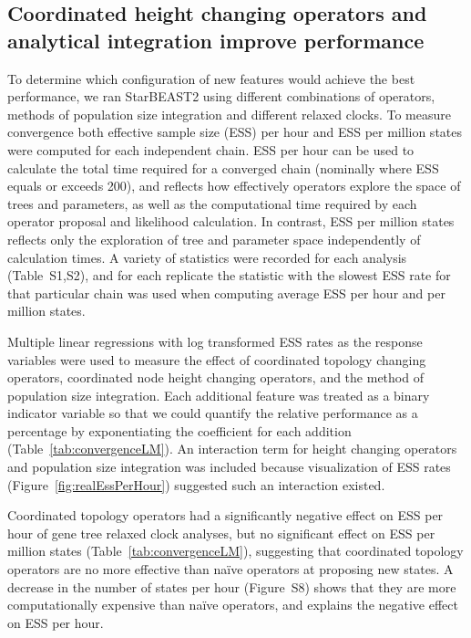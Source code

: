 \documentclass[nogrid]{MBE}%
\begin{document}
\subsection{Coordinated height changing operators and analytical integration improve performance}

To determine which configuration of new features would achieve the best
performance, we ran StarBEAST2 using different combinations of operators,
methods of population size integration and different relaxed clocks. To measure
convergence both effective sample size (ESS) per hour and ESS per million states
were computed for each independent chain. ESS per hour can be used to calculate
the total time required for a converged chain (nominally where ESS equals or
exceeds 200), and reflects how effectively operators explore the space of trees
and parameters, as well as the computational time required by each operator proposal
and likelihood calculation. In contrast, ESS per million states reflects only
the exploration of tree and parameter space independently of calculation times.
A variety of statistics were recorded for each analysis (Table~S1,S2), and for
each replicate the statistic with the slowest ESS rate for that particular chain
was used when computing average ESS per hour and per million states.

Multiple linear regressions with log transformed ESS rates as the response
variables were used to measure the effect of coordinated topology changing operators,
coordinated node height changing operators, and the method of population size
integration. Each additional feature was treated as a binary indicator variable
so that we could quantify the relative performance as a percentage by
exponentiating the coefficient for each addition
(Table~\ref{tab:convergenceLM}). An interaction term for height changing
operators and population size integration was included because visualization of
ESS rates (Figure~\ref{fig:realEssPerHour}) suggested such an interaction existed.

Coordinated topology operators had a significantly negative effect on ESS per
hour of gene tree relaxed clock analyses, but no significant effect on ESS per
million states (Table~\ref{tab:convergenceLM}), suggesting that coordinated
topology operators are no more effective than na\"ive operators at proposing new
states. A decrease in the number of states per hour (Figure~S8) shows that they
are more computationally expensive than na\"ive operators, and explains the
negative effect on ESS per hour.
\end{document}
